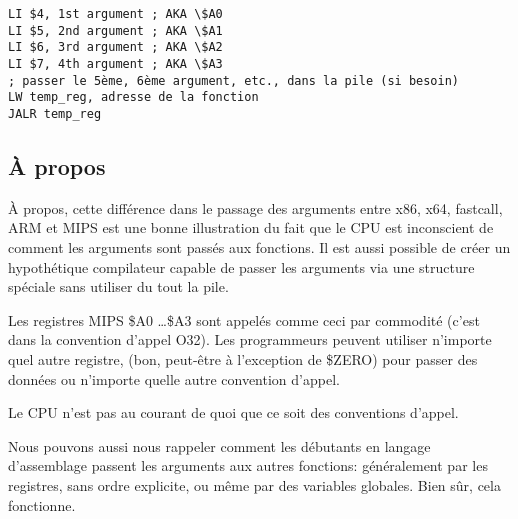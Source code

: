 \begin{lstlisting}[caption=MIPS (O32 calling convention),style=customasmMIPS]
LI $4, 1st argument ; AKA \$A0
LI $5, 2nd argument ; AKA \$A1
LI $6, 3rd argument ; AKA \$A2
LI $7, 4th argument ; AKA \$A3
; passer le 5ème, 6ème argument, etc., dans la pile (si besoin)
LW temp_reg, adresse de la fonction
JALR temp_reg
\end{lstlisting}

\subsection{À propos}

À propos, cette différence dans le passage des arguments entre x86, x64, fastcall, ARM
et MIPS est une bonne illustration du fait que le CPU est inconscient de comment
les arguments sont passés aux fonctions.
Il est aussi possible de créer un hypothétique compilateur capable de passer les
arguments via une structure spéciale sans utiliser du tout la pile.

Les registres MIPS \$A0 \dots \$A3 sont appelés comme ceci par commodité (c'est
dans la convention d'appel O32).
Les programmeurs peuvent utiliser n'importe quel autre registre, (bon, peut-être
à l'exception de \$ZERO) pour passer des données ou n'importe quelle autre convention d'appel.

Le \ac{CPU} n'est pas au courant de quoi que ce soit des conventions d'appel.

Nous pouvons aussi nous rappeler comment les débutants en langage d'assemblage passent
les arguments aux autres fonctions: généralement par les registres, sans ordre explicite,
ou même par des variables globales.
Bien sûr, cela fonctionne.

